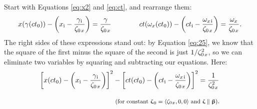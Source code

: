 \documentclass[12pt]{article}
\newcommand{\vvbeta}{\bm{\upbeta}}
\newcommand{\vvzeta}{\bm{\upzeta}}
\begin{document}
Start with Equations \ref{eq:x2} and \ref{eq:ct}, and rearrange them:
\begin{equation*}
x(\gamma(ct_0)) - \left( x_{\mathrm{i}} - \dfrac{\gamma_{\mkern1mu \mathrm{i}}}{ \zeta_{0 \mkern2mu x}} \right) = \dfrac{\gamma }{ \zeta_{0 \mkern2mu x}} \qquad \qquad  ct(\omega_x(ct_0)) - \left( ct_{\mathrm{i}} - \dfrac{\omega_{x \mkern2mu \textrm{i} }}{ \zeta_{0 \mkern2mu x}} \right) = \dfrac{\omega_x }{ \zeta_{0 \mkern2mu x}} .
\end{equation*}
The right sides of these expressions stand out: by Equation \ref{eq:25}, we know that the square of the first minus the square of the second is just $1 / \zeta^2_{0 \mkern2mu x}$, so we can eliminate two variables by squaring and subtracting our equations. Here:
\begin{equation}\label{eq:hm}
\begin{aligned}
\left[ x(ct_0) - \left( x_{\mathrm{i}} - \dfrac{\gamma_{\mkern1mu \mathrm{i}}}{\zeta_{0 \mkern2mu x}} \right) \right] ^2 &- \left[ ct(ct_0) - \left( ct_{\mathrm{i}} - \dfrac{\omega_{x \mkern2mu \textrm{i} }}{ \zeta_{0 \mkern2mu x}} \right) \right] ^2 = \dfrac{1}{ \zeta^2_{0 \mkern2mu x}} \\[8pt]
& \textrm{\footnotesize{ (for constant $\vvzeta_{\mkern1mu 0} = \langle \zeta_{0 \mkern1mu x} , 0, 0 \rangle$ and $\vvzeta \parallel \vvbeta$)}}.
\end{aligned}
\end{equation}
\end{document}
